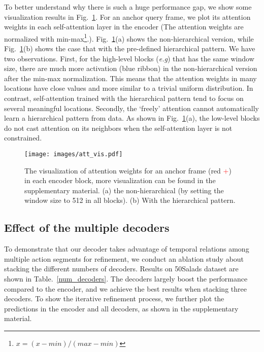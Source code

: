 \documentclass{bmvc2k}
\def\eg{\emph{e.g}\bmvaOneDot}
\begin{document}
To better understand why there is such a huge performance gap, we show some visualization results in Fig.~\ref{att_vis}. For an anchor query frame, we plot its attention weights in each self-attention layer in the encoder (The attention weights are normalized with min-max\footnote{$x = (x-min)/(max-min)$}.). Fig.~\ref{att_vis}(a) shows the non-hierarchical version, while Fig.~\ref{att_vis}(b) shows the case that with the pre-defined hierarchical pattern. We have two observations. First, for the high-level blocks (\eg{block \#9}) that has the same window size, there are much more activation (blue ribbon) in the non-hierarchical version after the min-max normalization. This means that the attention weights in many locations have close values and more similar to a trivial uniform distribution. In contrast, self-attention trained with the hierarchical pattern tend to focus on several meaningful locations. Secondly, the `freely' attention cannot automatically learn a hierarchical pattern from data. As shown in Fig.~\ref{att_vis}(a), the low-level blocks do not cast attention on its neighbors when the self-attention layer is not constrained. 

\begin{figure}[h]
\vspace{-0.4cm}
	\centering
	\texttt{[image: images/att\_vis.pdf]}
	\caption{The visualization of attention weights for an anchor frame (red \textcolor{red}{+}) in each encoder block, more visualization can be found in the supplementary material. (a) the non-hierarchical (by setting the window size to 512 in all blocks). (b) With the hierarchical pattern.}
	\label{att_vis}
    \vspace{-0.3cm}
\end{figure}


\subsection{Effect of the multiple decoders}
To demonstrate that our decoder takes advantage of temporal relations among multiple action segments for refinement, we conduct an ablation study about stacking the different numbers of decoders. Results on 50Salads dataset are shown in Table.~\ref{num_decoders}. The decoders largely boost the performance compared to the encoder, and we achieve the best results when stacking three decoders. To show the iterative refinement process, we further plot the predictions in the encoder and all decoders, as shown in the supplementary material. 
\end{document}
